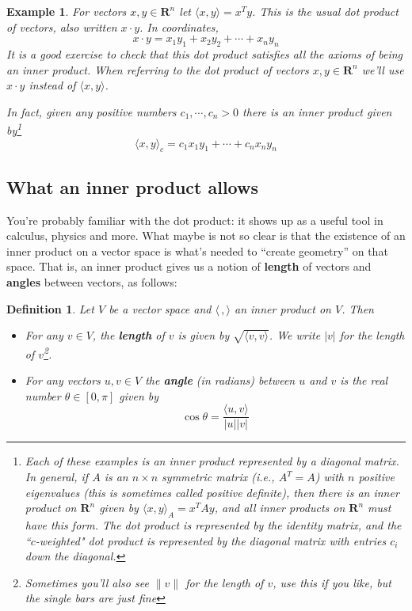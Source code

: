 \documentclass[12pt]{article}
\numberwithin{equation}{subsection}
\numberwithin{figure}{subsection}
\newtheorem{defn}[subsection]{Definition}
\theoremstyle{note}
\newtheorem{example}[subsection]{Example}
\newcommand{\R}{\mathbf{R}}
\newcommand\ip[2]{\langle #1, #2\rangle}
\begin{document}
\begin{example}
	For vectors $x,y\in \R^n$ let $\ip{x}{y}=x^Ty$. This is the usual \textit{dot product} of vectors, also written $x\cdot y$. In coordinates, \begin{equation} x\cdot y=x_1y_1+x_2y_2+\cdots+x_ny_n\end{equation} It is a good exercise to check that this dot product satisfies all the axioms of being an inner product. When referring to the dot product of vectors $x,y\in \R^n$ we'll use $x\cdot y$ instead of $\ip{x}{y}$. 
	
	In fact, given any positive numbers $c_1,\cdots,c_n>0$  there is an inner product given by\footnote{Each of these examples is an inner product represented by a diagonal matrix. In general, if $A$ is an $n\times n$ \textit{symmetric} matrix (i.e., $A^T=A$) with $n$ positive eigenvalues (this is sometimes called \textit{positive definite}), then there is an inner product on $\R^n$ given by $\ip{x}{y}_A=x^TAy$, and all inner products on $\R^n$ must have this form. The dot product is represented by the identity matrix, and the ``$c$-weighted" dot product is represented by the diagonal matrix with entries $c_i$ down the diagonal.} \[ \ip{x}{y}_c= c_1x_1y_1+\cdots+c_nx_ny_n\]
	
	 
\end{example}

\subsection{What an inner product allows}
You're probably familiar with the dot product: it shows up as a useful tool in calculus, physics and more. What maybe is not so clear is that the existence of an inner product on a vector space is what's needed to ``create geometry'' on that space. That is, an inner product gives us a notion of \textbf{length} of vectors and \textbf{angles} between vectors, as follows:

\begin{defn}
Let $V$ be a vector space and $\ip{\,}{}$ an inner product on $V$. Then
\begin{itemize}
	\item For any $v\in V$, the \textbf{length} of $v$ is given by $\sqrt{\ip{v}{v}}$. We write $|v|$ for the length of $v$\footnote{Sometimes you'll also see $\|v\|$ for the length of $v$, use this if you like, but the single bars are just fine}. 
	\item For any vectors $u,v\in V$ the \textbf{angle} (in radians) between $u$ and $v$ is the real number $\theta\in [0,\pi]$ given by \begin{equation} \label{eq-vec-angle} \cos \theta = \dfrac{ \ip{u}{v}}{|u||v|}\end{equation}
\end{itemize}
\end{defn}
\end{document}
